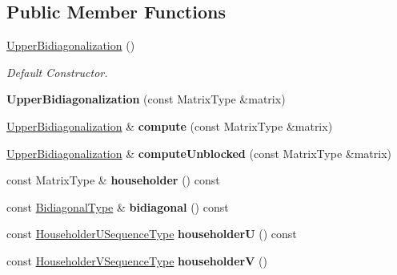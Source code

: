 \subsection*{Public Member Functions}
\begin{DoxyCompactItemize}
\item 
\mbox{\hyperlink{class_eigen_1_1internal_1_1_upper_bidiagonalization_aa37a7ca5f5e86e3efbc6907d03d89340}{Upper\+Bidiagonalization}} ()
\begin{DoxyCompactList}\small\item\em Default Constructor. \end{DoxyCompactList}\item 
\mbox{\label{class_eigen_1_1internal_1_1_upper_bidiagonalization_a0be89ad4d54df169e3607031e0284e20}} 
{\bfseries Upper\+Bidiagonalization} (const Matrix\+Type \&matrix)
\item 
\mbox{\label{class_eigen_1_1internal_1_1_upper_bidiagonalization_a77c1a3dba999febcdd9aa3d8bdb7d8df}} 
\mbox{\hyperlink{class_eigen_1_1internal_1_1_upper_bidiagonalization}{Upper\+Bidiagonalization}} \& {\bfseries compute} (const Matrix\+Type \&matrix)
\item 
\mbox{\label{class_eigen_1_1internal_1_1_upper_bidiagonalization_a9899e0a0ee6bf4771fe4ef2d133e3e72}} 
\mbox{\hyperlink{class_eigen_1_1internal_1_1_upper_bidiagonalization}{Upper\+Bidiagonalization}} \& {\bfseries compute\+Unblocked} (const Matrix\+Type \&matrix)
\item 
\mbox{\label{class_eigen_1_1internal_1_1_upper_bidiagonalization_ace16851d1d267d8f86caabdba8b56dfa}} 
const Matrix\+Type \& {\bfseries householder} () const
\item 
\mbox{\label{class_eigen_1_1internal_1_1_upper_bidiagonalization_a970d328a7b5fd3ad7ee9dd42c9952577}} 
const \mbox{\hyperlink{class_eigen_1_1internal_1_1_band_matrix}{Bidiagonal\+Type}} \& {\bfseries bidiagonal} () const
\item 
\mbox{\label{class_eigen_1_1internal_1_1_upper_bidiagonalization_a39887f7712de5be5a0487e9f6357b9da}} 
const \mbox{\hyperlink{class_eigen_1_1_householder_sequence}{Householder\+U\+Sequence\+Type}} {\bfseries householderU} () const
\item 
\mbox{\label{class_eigen_1_1internal_1_1_upper_bidiagonalization_a6ab970ae51909e56ceb63a49e06fdc98}} 
const \mbox{\hyperlink{class_eigen_1_1_householder_sequence}{Householder\+V\+Sequence\+Type}} {\bfseries householderV} ()
\end{DoxyCompactItemize}
